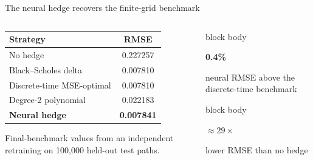 
\begin{frame}{The neural hedge recovers the finite-grid benchmark}
  \begin{columns}[T,onlytextwidth]
    \begin{column}{0.57\textwidth}
      \begin{table}
        \centering
        \fontsize{8.2}{9.5}\selectfont
        \begin{tabular}{lS[table-format=1.6]}
          \toprule
          Strategy & {RMSE}\\
          \midrule
          No hedge & 0.227257\\
          Black--Scholes delta & 0.007810\\
          Discrete-time MSE-optimal & 0.007810\\
          Degree-2 polynomial & 0.022183\\
          \textbf{Neural hedge} & \bfseries 0.007841\\
          \bottomrule
        \end{tabular}
      \end{table}
      \vspace{0.10cm}
      {\scriptsize Final-benchmark values from an independent retraining on 100,000 held-out test paths.\par}
    \end{column}
    \begin{column}{0.39\textwidth}
      \begin{beamercolorbox}[rounded=true,sep=0.15cm]{block body}
        \centering
        {\color{Teal}\fontsize{18}{20}\selectfont\bfseries 0.4\%\par}
        {\scriptsize neural RMSE above the discrete-time benchmark}
      \end{beamercolorbox}
      \vspace{0.10cm}
      \begin{beamercolorbox}[rounded=true,sep=0.15cm]{block body}
        \centering
        {\color{DeepNavy}\fontsize{19}{21}\selectfont\bfseries \(\approx29\times\)\par}
        {\scriptsize lower RMSE than no hedge}
      \end{beamercolorbox}
      \vspace{0.10cm}
    \end{column}
  \end{columns}
  \vspace{0.12cm}
\end{frame}

